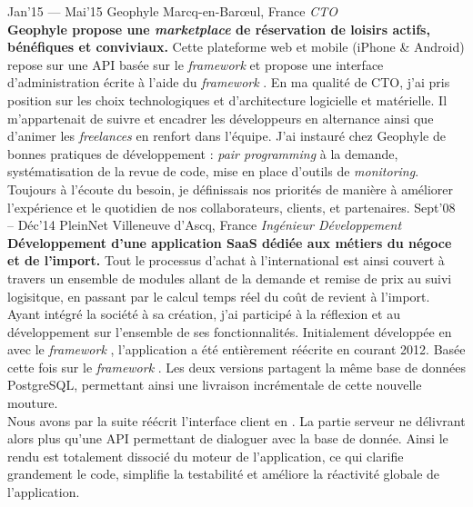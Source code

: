 \documentclass[]{cv} %
\begin{document}
\begin{entrylist}
\entry
{Jan'15 — Mai'15}
{Geophyle}
{Marcq-en-Barœul, France}
{\emph{CTO}
\vspace{5pt}\\
\textbf{Geophyle propose une \emph{marketplace} de réservation de loisirs actifs, bénéfiques et conviviaux.}
Cette plateforme web et mobile (iPhone \& Android) repose sur une API  basée sur le \emph{framework}  et propose une interface d'administration écrite à l'aide du \emph{framework} .
\vspace{5pt}
En ma qualité de CTO, j'ai pris position sur les choix technologiques et d'architecture logicielle et matérielle. Il m'appartenait de suivre et encadrer les développeurs en alternance ainsi que d'animer les \emph{freelances} en renfort dans l'équipe. J'ai instauré chez Geophyle de bonnes pratiques de développement : \emph{pair programming} à la demande, systématisation de la revue de code, mise en place d'outils de \emph{monitoring}. Toujours à l'écoute du besoin, je définissais nos priorités de manière à améliorer l'expérience et le quotidien de nos collaborateurs, clients, et partenaires.
}
\entry
{Sept'08 – Déc'14}
{PleinNet}
{Villeneuve d'Ascq, France}
{\emph{Ingénieur Développement}
\vspace{5pt}\\
\textbf{Développement d'une application SaaS dédiée aux métiers du négoce et de l'import.} Tout le processus d'achat à l'international est ainsi couvert à travers un ensemble de modules allant de la demande et remise de prix au suivi logisitque, en passant par le calcul temps réel du coût de revient à l'import.
\vspace{5pt}
Ayant intégré la société à sa création, j'ai participé à la réflexion et au développement sur l'ensemble de ses fonctionnalités. Initialement développée en  avec le \emph{framework} , l'application a été entièrement réécrite en  courant 2012. Basée cette fois sur le \emph{framework} . Les deux versions partagent la même base de données PostgreSQL, permettant ainsi une livraison incrémentale de cette nouvelle mouture.
\vspace{5pt}\\
Nous avons par la suite réécrit l'interface client en . La partie serveur ne délivrant alors plus qu'une API permettant de dialoguer avec la base de donnée. Ainsi le rendu est totalement dissocié du moteur de l'application, ce qui clarifie grandement le code, simplifie la testabilité et améliore la réactivité globale de l'application.
}
\end{entrylist}
\end{document}
